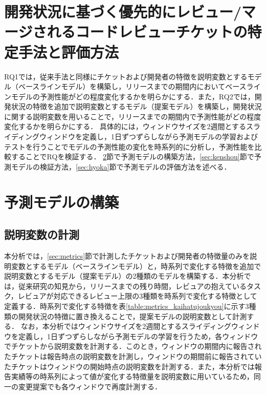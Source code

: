 \documentclass[submit]{ipsj}
\begin{document}
\section{開発状況に基づく優先的にレビュー/マージされるコードレビューチケットの特定手法と評価方法}\label{sec:analysis_method}

RQ1では，従来手法と同様にチケットおよび開発者の特徴を説明変数とするモデル（ベースラインモデル）を構築し，リリースまでの期間内においてベースラインモデルの予測性能がどの程度変化するかを明らかにする．また，RQ2では，開発状況の特徴を追加で説明変数とするモデル（提案モデル）を構築し，開発状況に関する説明変数を用いることで，リリースまでの期間内で予測性能がどの程度変化するかを明らかにする．
具体的には，ウィンドウサイズを2週間とするスライディングウィンドウを定義し，1日ずつずらしながら予測モデルの学習およびテストを行うことでモデルの予測性能の変化を時系列的に分析し，予測性能を比較することでRQを検証する．
\ref{sec:koutiku}節で予測モデルの構築方法，\ref{sec:kenshou}節で予測モデルの検証方法，\ref{sec:hyoka}節で予測モデルの評価方法を述べる．


\section{予測モデルの構築}\label{sec:koutiku}

\subsection{説明変数の計測}\label{sec:setumeihensuu}
本分析では，\ref{sec:metrics}節で計測したチケットおよび開発者の特徴量のみを説明変数とするモデル（ベースラインモデル）と，時系列で変化する特徴を追加で説明変数とするモデル（提案モデル）の2種類のモデルを構築する．本分析では，従来研究\cite{integrator}\cite{release_merge}の知見から，リリースまでの残り時間，レビュアの抱えているタスク，レビュアが対応できるレビュー上限の3種類を時系列で変化する特徴として定義する．時系列で変化する特徴を表\ref{table:metrics_kaihatujoukyou}に示す3種類の開発状況の特徴に置き換えることで，提案モデルの説明変数として計測する．
なお，本分析ではウィンドウサイズを2週間とするスライディングウィンドウを定義し，1日ずつずらしながら予測モデルの学習を行うため，各ウィンドウでチケットから説明変数を計測する．このとき，ウィンドウの期間内に報告されたチケットは報告時点の説明変数を計測し，ウィンドウの期間前に報告されていたチケットはウィンドウの開始時点の説明変数を計測する．また，本分析では報告実績等の時系列によって値が変化する特徴量を説明変数に用いているため，同一の変更提案でも各ウィンドウで再度計測する．
\end{document}
